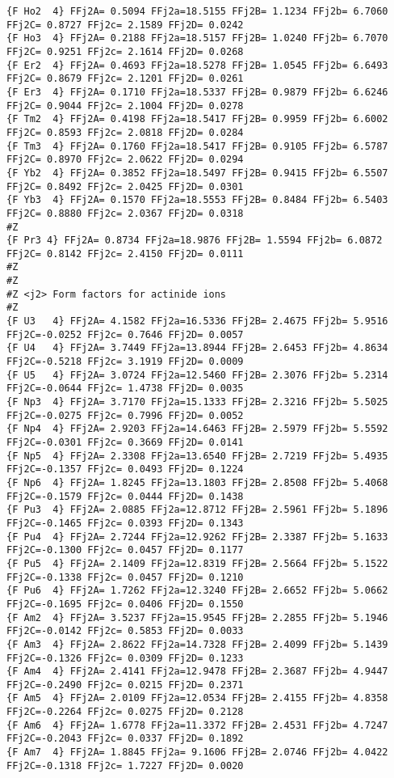 {\begin{verbatim}
{F Ho2  4} FFj2A= 0.5094 FFj2a=18.5155 FFj2B= 1.1234 FFj2b= 6.7060 FFj2C= 0.8727 FFj2c= 2.1589 FFj2D= 0.0242 
{F Ho3  4} FFj2A= 0.2188 FFj2a=18.5157 FFj2B= 1.0240 FFj2b= 6.7070 FFj2C= 0.9251 FFj2c= 2.1614 FFj2D= 0.0268 
{F Er2  4} FFj2A= 0.4693 FFj2a=18.5278 FFj2B= 1.0545 FFj2b= 6.6493 FFj2C= 0.8679 FFj2c= 2.1201 FFj2D= 0.0261 
{F Er3  4} FFj2A= 0.1710 FFj2a=18.5337 FFj2B= 0.9879 FFj2b= 6.6246 FFj2C= 0.9044 FFj2c= 2.1004 FFj2D= 0.0278 
{F Tm2  4} FFj2A= 0.4198 FFj2a=18.5417 FFj2B= 0.9959 FFj2b= 6.6002 FFj2C= 0.8593 FFj2c= 2.0818 FFj2D= 0.0284 
{F Tm3  4} FFj2A= 0.1760 FFj2a=18.5417 FFj2B= 0.9105 FFj2b= 6.5787 FFj2C= 0.8970 FFj2c= 2.0622 FFj2D= 0.0294 
{F Yb2  4} FFj2A= 0.3852 FFj2a=18.5497 FFj2B= 0.9415 FFj2b= 6.5507 FFj2C= 0.8492 FFj2c= 2.0425 FFj2D= 0.0301 
{F Yb3  4} FFj2A= 0.1570 FFj2a=18.5553 FFj2B= 0.8484 FFj2b= 6.5403 FFj2C= 0.8880 FFj2c= 2.0367 FFj2D= 0.0318 
#Z
{F Pr3 4} FFj2A= 0.8734 FFj2a=18.9876 FFj2B= 1.5594 FFj2b= 6.0872 FFj2C= 0.8142 FFj2c= 2.4150 FFj2D= 0.0111 
#Z
#Z
#Z <j2> Form factors for actinide ions
#Z
{F U3   4} FFj2A= 4.1582 FFj2a=16.5336 FFj2B= 2.4675 FFj2b= 5.9516 FFj2C=-0.0252 FFj2c= 0.7646 FFj2D= 0.0057 
{F U4   4} FFj2A= 3.7449 FFj2a=13.8944 FFj2B= 2.6453 FFj2b= 4.8634 FFj2C=-0.5218 FFj2c= 3.1919 FFj2D= 0.0009 
{F U5   4} FFj2A= 3.0724 FFj2a=12.5460 FFj2B= 2.3076 FFj2b= 5.2314 FFj2C=-0.0644 FFj2c= 1.4738 FFj2D= 0.0035 
{F Np3  4} FFj2A= 3.7170 FFj2a=15.1333 FFj2B= 2.3216 FFj2b= 5.5025 FFj2C=-0.0275 FFj2c= 0.7996 FFj2D= 0.0052 
{F Np4  4} FFj2A= 2.9203 FFj2a=14.6463 FFj2B= 2.5979 FFj2b= 5.5592 FFj2C=-0.0301 FFj2c= 0.3669 FFj2D= 0.0141 
{F Np5  4} FFj2A= 2.3308 FFj2a=13.6540 FFj2B= 2.7219 FFj2b= 5.4935 FFj2C=-0.1357 FFj2c= 0.0493 FFj2D= 0.1224 
{F Np6  4} FFj2A= 1.8245 FFj2a=13.1803 FFj2B= 2.8508 FFj2b= 5.4068 FFj2C=-0.1579 FFj2c= 0.0444 FFj2D= 0.1438 
{F Pu3  4} FFj2A= 2.0885 FFj2a=12.8712 FFj2B= 2.5961 FFj2b= 5.1896 FFj2C=-0.1465 FFj2c= 0.0393 FFj2D= 0.1343 
{F Pu4  4} FFj2A= 2.7244 FFj2a=12.9262 FFj2B= 2.3387 FFj2b= 5.1633 FFj2C=-0.1300 FFj2c= 0.0457 FFj2D= 0.1177 
{F Pu5  4} FFj2A= 2.1409 FFj2a=12.8319 FFj2B= 2.5664 FFj2b= 5.1522 FFj2C=-0.1338 FFj2c= 0.0457 FFj2D= 0.1210 
{F Pu6  4} FFj2A= 1.7262 FFj2a=12.3240 FFj2B= 2.6652 FFj2b= 5.0662 FFj2C=-0.1695 FFj2c= 0.0406 FFj2D= 0.1550 
{F Am2  4} FFj2A= 3.5237 FFj2a=15.9545 FFj2B= 2.2855 FFj2b= 5.1946 FFj2C=-0.0142 FFj2c= 0.5853 FFj2D= 0.0033 
{F Am3  4} FFj2A= 2.8622 FFj2a=14.7328 FFj2B= 2.4099 FFj2b= 5.1439 FFj2C=-0.1326 FFj2c= 0.0309 FFj2D= 0.1233 
{F Am4  4} FFj2A= 2.4141 FFj2a=12.9478 FFj2B= 2.3687 FFj2b= 4.9447 FFj2C=-0.2490 FFj2c= 0.0215 FFj2D= 0.2371 
{F Am5  4} FFj2A= 2.0109 FFj2a=12.0534 FFj2B= 2.4155 FFj2b= 4.8358 FFj2C=-0.2264 FFj2c= 0.0275 FFj2D= 0.2128 
{F Am6  4} FFj2A= 1.6778 FFj2a=11.3372 FFj2B= 2.4531 FFj2b= 4.7247 FFj2C=-0.2043 FFj2c= 0.0337 FFj2D= 0.1892 
{F Am7  4} FFj2A= 1.8845 FFj2a= 9.1606 FFj2B= 2.0746 FFj2b= 4.0422 FFj2C=-0.1318 FFj2c= 1.7227 FFj2D= 0.0020 


\end{verbatim}}
